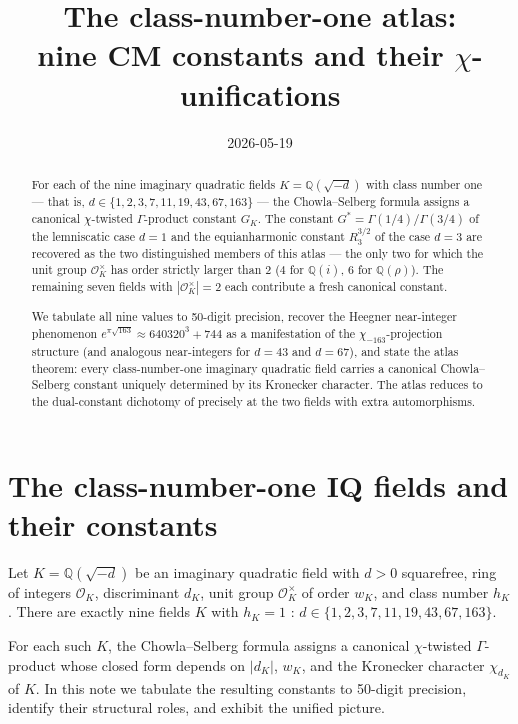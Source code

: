 \documentclass[11pt]{amsart}
\title{The class-number-one atlas:\\
\large nine CM constants and their $\chi$-unifications}
\author{}
\date{2026-05-19}
\theoremstyle{plain}
\theoremstyle{definition}
\theoremstyle{remark}
\newcommand{\Gs}{G^{*}}
\newcommand{\GK}{G_{K}}
\newcommand{\Q}{\mathbb{Q}}
\begin{document}
\maketitle

\begin{abstract}
For each of the nine imaginary quadratic fields $K = \Q(\sqrt{-d})$ with
class number one --- that is, $d \in \{1, 2, 3, 7, 11, 19, 43, 67, 163\}$ ---
the Chowla--Selberg formula assigns a canonical $\chi$-twisted
$\Gamma$-product constant $\GK$. The constant $\Gs = \Gamma(1/4)/\Gamma(3/4)$
of the lemniscatic case $d = 1$ \cite{paper-gstar-A} and the equianharmonic
constant $R_3^{3/2}$ of the case $d = 3$ are recovered as the two
distinguished members of this atlas --- the only two for which the unit
group $\mathcal{O}_K^{\times}$ has order strictly larger than $2$ ($4$ for
$\Q(i)$, $6$ for $\Q(\rho)$). The remaining seven fields with
$|\mathcal{O}_K^{\times}| = 2$ each contribute a fresh canonical constant.

We tabulate all nine values to 50-digit precision, recover the
Heegner near-integer phenomenon
$e^{\pi\sqrt{163}} \approx 640320^{3} + 744$ as a manifestation of the
$\chi_{-163}$-projection structure (and analogous near-integers for
$d = 43$ and $d = 67$), and state the atlas theorem: every
class-number-one imaginary quadratic field carries a canonical
Chowla--Selberg constant uniquely determined by its Kronecker character.
The atlas reduces to the dual-constant dichotomy of \cite{paper-gstar-A}
precisely at the two fields with extra automorphisms.
\end{abstract}

\tableofcontents

\section{The class-number-one IQ fields and their constants}\label{sec:intro}

Let $K = \Q(\sqrt{-d})$ be an imaginary quadratic field with $d > 0$
squarefree, ring of integers $\mathcal{O}_K$, discriminant $d_K$, unit
group $\mathcal{O}_K^{\times}$ of order $w_K$, and class number $h_K$.
There are exactly nine fields $K$ with $h_K = 1$ \cite{stark1967}:
$d \in \{1, 2, 3, 7, 11, 19, 43, 67, 163\}$.

For each such $K$, the Chowla--Selberg formula \cite{chowlaselberg}
assigns a canonical $\chi$-twisted $\Gamma$-product whose closed form
depends on $|d_K|$, $w_K$, and the Kronecker character $\chi_{d_K}$ of
$K$. In this note we tabulate the resulting constants to 50-digit
precision, identify their structural roles, and exhibit the unified
picture.
\end{document}
